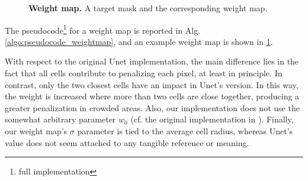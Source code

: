 %
\begin{figure}
    \centering
    \caption{\textbf{Weight map.} A target mask and the corresponding weight map.}
    \label{fig:weight_map_example}
\end{figure}
%
The pseudocode\footnote{full implementation \githubweights} for a weight map is reported in Alg. \ref{algo:pseudocode_weightmap}, and an example weight map is shown in \cref{fig:weight_map_example}.

With respect to the original Unet implementation, the main difference lies in the fact that all cells contribute to penalizing each pixel, at least in principle. In contrast, only the two closest cells have an impact in Unet's version.
In this way, the weight is increased where more than two cells are close together, producing a greater penalization in crowded areas.
Also, our implementation does not use the somewhat arbitrary parameter $w_0$ (cf. the original implementation in ).
Finally, our weight map's $\sigma$ parameter is tied to the average cell radius, whereas Unet's value does not seem attached to any tangible reference or meaning.


